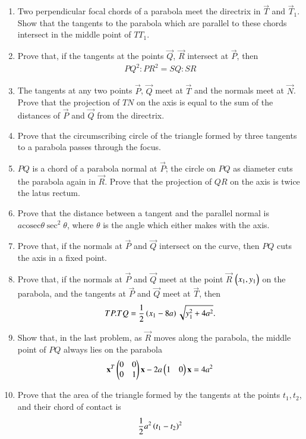 \begin{enumerate}[label=\arabic*.,ref=\thesubsection.\theenumi]
\item Two perpendicular focal chords of a parabola meet the directrix in $\vec{T}$ and $\vec{T}_1$.
Show that the tangents to the parabola which are parallel to these chords intersect in the middle point of $TT_1$.
\item Prove that, if the tangents at the points $\vec{Q}$, $\vec{R}$ intersect at $\vec{P}$, then 
\begin{align}
PQ^2:PR^2=SQ:SR
\end{align}
\item The tangents at any two points $\vec{P}$, $\vec{Q}$ meet at $\vec{T}$ and the normals meet at $\vec{N}$.  Prove that the projection
of $TN$ on the axis is equal to the sum of the distances of $\vec{P}$ and $\vec{Q}$ from the directrix.
\item Prove that the circumscribing circle of the triangle formed by three tangents to a parabola
passes through the focus.
\item $PQ$ is a chord of a parabola normal at $\vec{P}$; the circle on $PQ$ as diameter cuts the parabola again in $\vec{R}$.  Prove that the projection
of $QR$ on the axis is twice the latus rectum.
\item Prove that the distance between a tangent and the parallel normal is $a\text{cosec}\theta\sec^2\theta$, where $\theta$ is the
angle which either makes with the axis.
\item Prove that, if the normals at $\vec{P}$ and $\vec{Q}$ intersect on the curve, then $PQ$ cuts the axis in
a fixed point.
\item Prove that, if the normals at $\vec{P}$ and $\vec{Q}$ meet at the point $\vec{R}$ $\begin{pmatrix}x_1,y_1\end{pmatrix}$ on the parabola, and the tangents at $\vec{P}$ and $\vec{Q}$
meet at $\vec{T}$, then
\begin{align}
TP.TQ=\frac{1}{2}\left(x_1-8a\right)\sqrt{y_1^2+4a^2}.
\end{align}
\item Show that, in the last problem, as $\vec{R}$ moves along the parabola, the middle point of $PQ$
always lies on the parabola
\begin{align}
\label{eq:parab_standard}
\mathbf{x}^T\begin{pmatrix}0 & 0\\0 & 1\end{pmatrix}\mathbf{x}-2a\begin{pmatrix}1 & 0 \end{pmatrix}\mathbf{x}= 4a^2 
\end{align}
\item Prove that the area of the triangle formed by the tangents at the points $t_1,t_2$, and their chord of 
contact is
\begin{align}
\frac{1}{2}a^2\brak{t_1-t_2}^2

\end{align}
\end{enumerate}
